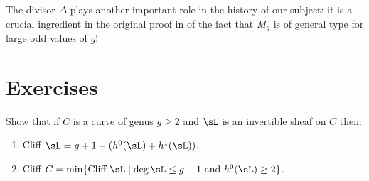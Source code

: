 The divisor $\Delta$ plays another important role
in the history of our subject: it is a crucial ingredient in the original proof in
\cite{Harris-MumfordModuli} of the fact that $M_{g}$ is of general type for large odd values of $g$!

\section{Exercises}

\begin{exercise}\label{forms of Clifford}
Show that if $C$ is a curve of genus $g\geq 2$ 
and $\sL$ is an invertible sheaf on $C$ then:
\begin{enumerate}
 \item Cliff $\sL = g+1-(h^{0}(\sL)+h^{1}(\sL))$.
 \item Cliff $C = \min\{\hbox {Cliff }\sL \mid \deg \sL \leq g-1 \hbox{ and } h^{0}(\sL) \geq 2\}$.
\end{enumerate}\label{tnih18.1}
\end{exercise}

